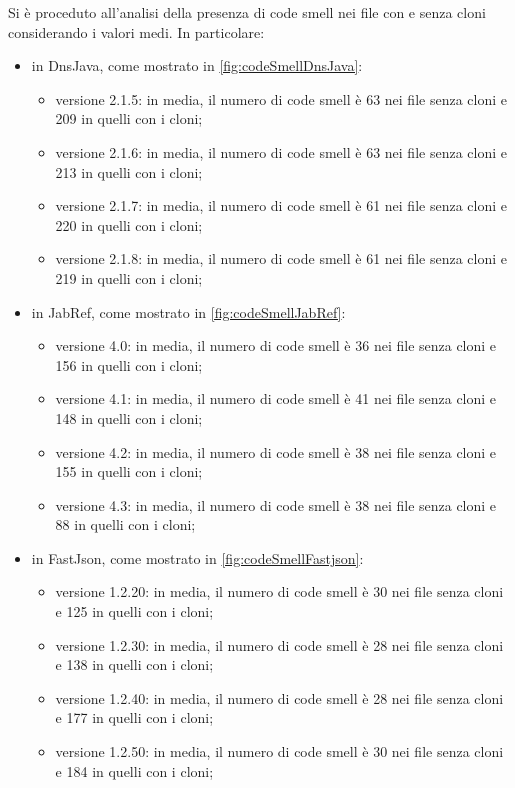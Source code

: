 Si è proceduto all'analisi della presenza di code smell nei file con e senza cloni considerando i valori medi. In particolare:
\begin{itemize}
	\item in DnsJava, come mostrato in \autoref{fig:codeSmellDnsJava}:
	\begin{itemize}
		\item versione 2.1.5: in media, il numero di code smell è 63 nei file senza cloni e 209 in quelli con i cloni;
		\item versione 2.1.6: in media, il numero di code smell è 63 nei file senza cloni e 213 in quelli con i cloni;
		\item versione 2.1.7: in media, il numero di code smell è 61 nei file senza cloni e 220 in quelli con i cloni;
		\item versione 2.1.8: in media, il numero di code smell è 61 nei file senza cloni e 219 in quelli con i cloni;
	\end{itemize}
	\item in JabRef, come mostrato in \autoref{fig:codeSmellJabRef}:
	\begin{itemize}
		\item versione 4.0: in media, il numero di code smell è 36 nei file senza cloni e 156 in quelli con i cloni;
		\item versione 4.1: in media, il numero di code smell è 41 nei file senza cloni e 148 in quelli con i cloni;
		\item versione 4.2: in media, il numero di code smell è 38 nei file senza cloni e 155 in quelli con i cloni;
		\item versione 4.3: in media, il numero di code smell è 38 nei file senza cloni e 88 in quelli con i cloni;
	\end{itemize}
	\item in FastJson, come mostrato in \autoref{fig:codeSmellFastjson}:
	\begin{itemize}
		\item versione 1.2.20: in media, il numero di code smell è 30 nei file senza cloni e 125 in quelli con i cloni;
		\item versione 1.2.30: in media, il numero di code smell è 28 nei file senza cloni e 138 in quelli con i cloni;
		\item versione 1.2.40: in media, il numero di code smell è 28 nei file senza cloni e 177 in quelli con i cloni;
		\item versione 1.2.50: in media, il numero di code smell è 30 nei file senza cloni e 184 in quelli con i cloni;
	\end{itemize}
\end{itemize}

